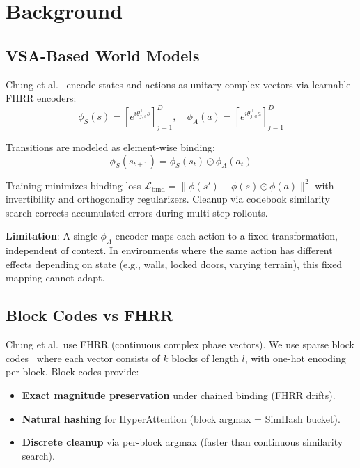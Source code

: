 \documentclass[journal]{IEEEtai}
\begin{document}
\section{Background}

\subsection{VSA-Based World Models}

Chung et al.~\cite{chung2025geometric} encode states and actions as unitary complex vectors via learnable FHRR encoders:
\begin{equation}
\phi_S(s) = \left[e^{i\theta_{j,s}^\top s}\right]_{j=1}^D, \quad \phi_A(a) = \left[e^{i\theta_{j,a}^\top a}\right]_{j=1}^D
\end{equation}

Transitions are modeled as element-wise binding:
\begin{equation}
\phi_S(s_{t+1}) = \phi_S(s_t) \odot \phi_A(a_t)
\end{equation}

Training minimizes binding loss $\mathcal{L}_\mathrm{bind} = \|\phi(s') - \phi(s) \odot \phi(a)\|^2$ with invertibility and orthogonality regularizers. Cleanup via codebook similarity search corrects accumulated errors during multi-step rollouts.

\textbf{Limitation}: A single $\phi_A$ encoder maps each action to a fixed transformation, independent of context. In environments where the same action has different effects depending on state (e.g., walls, locked doors, varying terrain), this fixed mapping cannot adapt.

\subsection{Block Codes vs FHRR}

Chung et al.\ use FHRR (continuous complex phase vectors). We use sparse block codes~\cite{hersche2023nvsa, grillcheese2025hmm} where each vector consists of $k$ blocks of length $l$, with one-hot encoding per block. Block codes provide:
\begin{itemize}
\item \textbf{Exact magnitude preservation} under chained binding (FHRR drifts).
\item \textbf{Natural hashing} for HyperAttention (block argmax = SimHash bucket).
\item \textbf{Discrete cleanup} via per-block argmax (faster than continuous similarity search).
\end{itemize}
\end{document}
